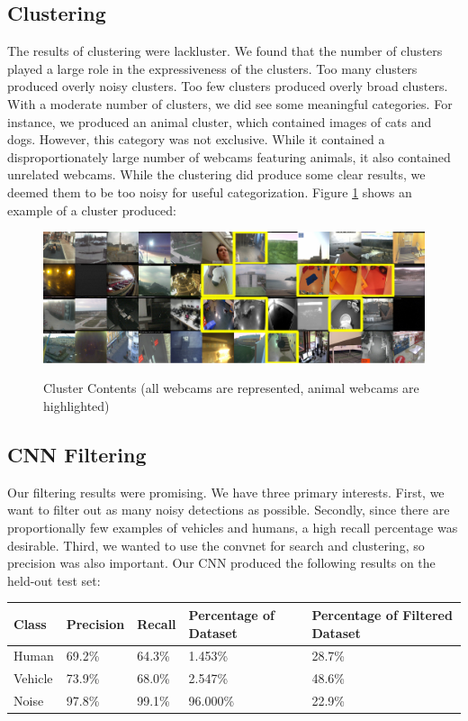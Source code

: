 \documentclass[10pt]{article} %
\begin{document}
\subsection{Clustering}
The results of clustering were lackluster. We found that the number of clusters
played a large role in the expressiveness of the clusters. Too many clusters
produced overly noisy clusters. Too few clusters produced overly broad
clusters. With a moderate number of clusters, we did see some meaningful
categories. For instance, we produced an animal cluster, which contained images
of cats and dogs. However, this category was not exclusive. While it contained
a disproportionately large number of webcams featuring animals, it also
contained unrelated webcams. While the clustering did produce some clear
results, we deemed them to be too noisy for useful categorization. Figure \ref{clustering} shows an
example of a cluster produced:
\begin{figure}[H]
\centering
\caption{Cluster Contents (all webcams are represented, animal webcams are highlighted)}
\includegraphics[scale = 0.35]{animals}
\label{clustering}
\end{figure}

\subsection{CNN Filtering}
Our filtering results were promising. We have three primary interests. First,
we want to filter out as many noisy detections as possible.  Secondly, since
there are proportionally few examples of vehicles and humans, a high recall
percentage was desirable. Third, we wanted to use the convnet for search and
clustering, so precision was also important. Our CNN produced the following
results on the held-out test set:
\begin{center}
  \begin{tabular}{ | m{5em} | m{5em}| m{5em} | m{9em} | m{13em} | } 
    \hline
    Class & Precision & Recall & Percentage of Dataset & Percentage of Filtered Dataset  \\ 
    \hline
    Human & 69.2\% & 64.3\% & 1.453\% & 28.7\%  \\ 
    \hline
    Vehicle & 73.9\%  & 68.0\% & 2.547\% & 48.6\% \\ 
    \hline
    Noise & 97.8\%  &99.1\% & 96.000\% & 22.9\%  \\ 
    \hline
  \end{tabular}
\end{center}
\end{document}
